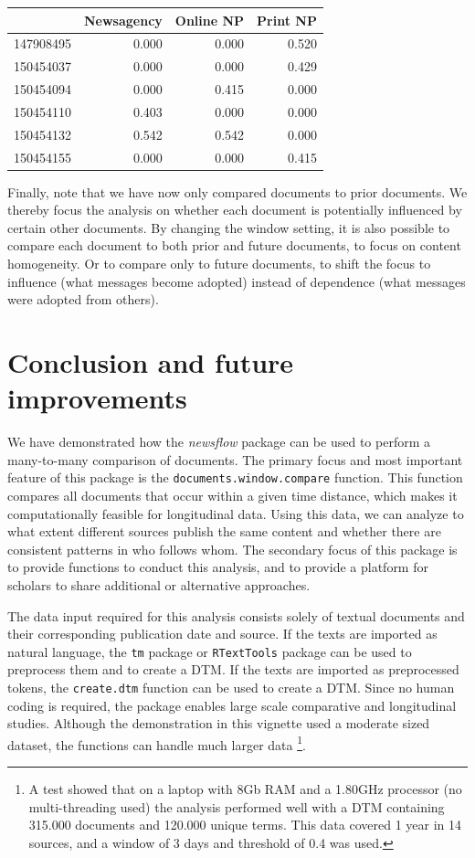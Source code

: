 \documentclass[]{article}
\let\rmarkdownfootnote\footnote%
\def\footnote{\protect\rmarkdownfootnote}
\begin{document}
\begin{longtable}[c]{@{}lrrr@{}}
\toprule
& Newsagency & Online NP & Print NP\tabularnewline
\midrule
\endhead
147908495 & 0.000 & 0.000 & 0.520\tabularnewline
150454037 & 0.000 & 0.000 & 0.429\tabularnewline
150454094 & 0.000 & 0.415 & 0.000\tabularnewline
150454110 & 0.403 & 0.000 & 0.000\tabularnewline
150454132 & 0.542 & 0.542 & 0.000\tabularnewline
150454155 & 0.000 & 0.000 & 0.415\tabularnewline
\bottomrule
\end{longtable}

Finally, note that we have now only compared documents to prior
documents. We thereby focus the analysis on whether each document is
potentially influenced by certain other documents. By changing the
window setting, it is also possible to compare each document to both
prior and future documents, to focus on content homogeneity. Or to
compare only to future documents, to shift the focus to influence (what
messages become adopted) instead of dependence (what messages were
adopted from others).

\section{Conclusion and future
improvements}\label{conclusion-and-future-improvements}

We have demonstrated how the \emph{newsflow} package can be used to
perform a many-to-many comparison of documents. The primary focus and
most important feature of this package is the
\texttt{documents.window.compare} function. This function compares all
documents that occur within a given time distance, which makes it
computationally feasible for longitudinal data. Using this data, we can
analyze to what extent different sources publish the same content and
whether there are consistent patterns in who follows whom. The secondary
focus of this package is to provide functions to conduct this analysis,
and to provide a platform for scholars to share additional or
alternative approaches.

The data input required for this analysis consists solely of textual
documents and their corresponding publication date and source. If the
texts are imported as natural language, the \texttt{tm} package or
\texttt{RTextTools} package can be used to preprocess them and to create
a DTM. If the texts are imported as preprocessed tokens, the
\texttt{create.dtm} function can be used to create a DTM. Since no human
coding is required, the package enables large scale comparative and
longitudinal studies. Although the demonstration in this vignette used a
moderate sized dataset, the functions can handle much larger data
\footnote{A test showed that on a laptop with 8Gb RAM and a 1.80GHz
  processor (no multi-threading used) the analysis performed well with a
  DTM containing 315.000 documents and 120.000 unique terms. This data
  covered 1 year in 14 sources, and a window of 3 days and threshold of
  0.4 was used.}.
\end{document}
